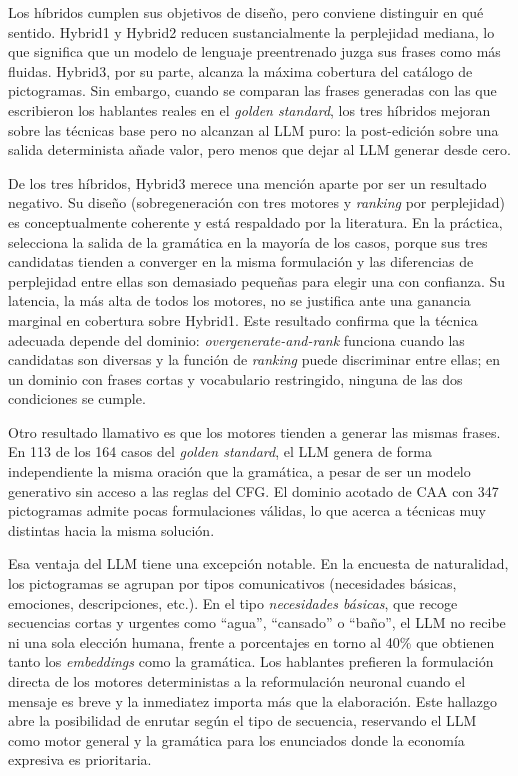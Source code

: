 Los híbridos cumplen sus objetivos de diseño, pero conviene distinguir en qué sentido. Hybrid1 y Hybrid2 reducen sustancialmente la perplejidad mediana, lo que significa que un modelo de lenguaje preentrenado juzga sus frases como más fluidas. Hybrid3, por su parte, alcanza la máxima cobertura del catálogo de pictogramas. Sin embargo, cuando se comparan las frases generadas con las que escribieron los hablantes reales en el \textit{golden standard}, los tres híbridos mejoran sobre las técnicas base pero no alcanzan al LLM puro: la post-edición sobre una salida determinista añade valor, pero menos que dejar al LLM generar desde cero.

De los tres híbridos, Hybrid3 merece una mención aparte por ser un resultado negativo. Su diseño (sobregeneración con tres motores y \textit{ranking} por perplejidad) es conceptualmente coherente y está respaldado por la literatura. En la práctica, selecciona la salida de la gramática en la mayoría de los casos, porque sus tres candidatas tienden a converger en la misma formulación y las diferencias de perplejidad entre ellas son demasiado pequeñas para elegir una con confianza. Su latencia, la más alta de todos los motores, no se justifica ante una ganancia marginal en cobertura sobre Hybrid1. Este resultado confirma que la técnica adecuada depende del dominio: \textit{overgenerate-and-rank} funciona cuando las candidatas son diversas y la función de \textit{ranking} puede discriminar entre ellas; en un dominio con frases cortas y vocabulario restringido, ninguna de las dos condiciones se cumple.

Otro resultado llamativo es que los motores tienden a generar las mismas frases. En 113 de los 164 casos del \textit{golden standard}, el LLM genera de forma independiente la misma oración que la gramática, a pesar de ser un modelo generativo sin acceso a las reglas del CFG. El dominio acotado de CAA con 347 pictogramas admite pocas formulaciones válidas, lo que acerca a técnicas muy distintas hacia la misma solución.

Esa ventaja del LLM tiene una excepción notable. En la encuesta de naturalidad, los pictogramas se agrupan por tipos comunicativos (necesidades básicas, emociones, descripciones, etc.). En el tipo \textit{necesidades básicas}, que recoge secuencias cortas y urgentes como ``agua'', ``cansado'' o ``baño'', el LLM no recibe ni una sola elección humana, frente a porcentajes en torno al 40\% que obtienen tanto los \textit{embeddings} como la gramática. Los hablantes prefieren la formulación directa de los motores deterministas a la reformulación neuronal cuando el mensaje es breve y la inmediatez importa más que la elaboración. Este hallazgo abre la posibilidad de enrutar según el tipo de secuencia, reservando el LLM como motor general y la gramática para los enunciados donde la economía expresiva es prioritaria.

